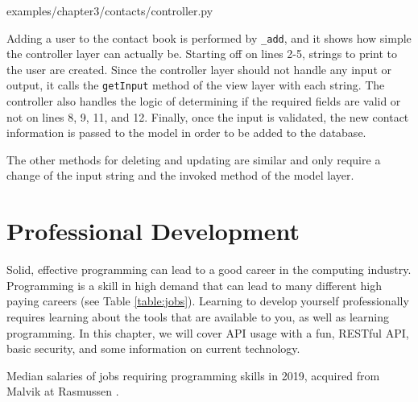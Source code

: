 \documentclass[12pt, oneside, a4paper]{book}
\begin{document}
      
      {examples/chapter3/contacts/controller.py}

      Adding a user to the contact book is performed by \lstinline!_add!, and it shows how simple the controller layer can actually be.
      Starting off on lines 2-5, strings to print to the user are created.
      Since the controller layer should not handle any input or output, it calls the \lstinline!getInput! method of the view layer with each string.
      The controller also handles the logic of determining if the required fields are valid or not on lines 8, 9, 11, and 12.
      Finally, once the input is validated, the new contact information is passed to the model in order to be added to the database.

      The other methods for deleting and updating are similar and only require a change of the input string and the invoked method of the model layer.
   \chapter{Professional Development}
   \label{chap:prof_devel}
      Solid, effective programming can lead to a good career in the computing industry.
      Programming is a skill in high demand that can lead to many different high paying careers (see Table \ref*{table:jobs}).
      Learning to develop yourself professionally requires learning about the tools that are available to you, as well as learning programming.
      In this chapter, we will cover API usage with a fun, RESTful API, basic security, and some information on current technology.
      \begin{table}[H]
         \caption{
            Median salaries of jobs requiring programming skills in 2019, acquired from Malvik at Rasmussen \autocite{malvikProgrammingCareersCoding}.
         }
         \label{table:jobs}
      \end{table}
\end{document}
